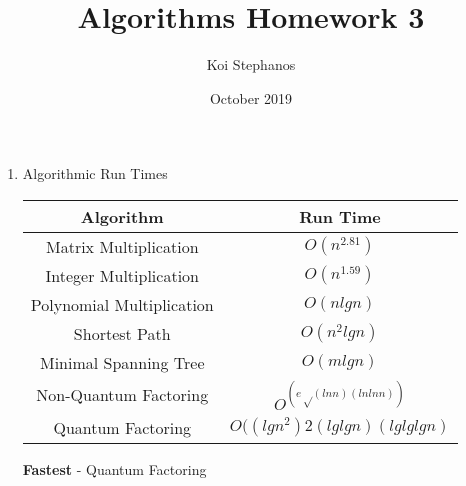 \documentclass{article}
\title{Algorithms Homework 3}
\author{Koi Stephanos}
\date{October 2019}
\begin{document}
\maketitle

\begin{enumerate}
    \item 
Algorithmic Run Times

    \begin{table}[htbp]
        \centering
        \begin{tabular}{|c|c|}
        \hline
             Algorithm & Run Time  \\
        \hline
                Matrix Multiplication \cite{Vazirani}     &      \(O(n^2.81)\)      \\
        \hline
                Integer Multiplication \cite{Vazirani}    &    \(O(n^1.59)\)        \\
        \hline
                Polynomial Multiplication \cite{Vazirani}     &     \(O(n lg n)\)    \\
        \hline
                Shortest Path \cite{CMU}    &      \(O(n^2 lg n)\)    \\
        \hline
                Minimal Spanning Tree \cite{Jordan}    &    \(O(m lg n)\)            \\
        \hline
                Non-Quantum Factoring \cite{Purdue}    &    \(O^(e√(ln n)(ln ln n))\)          \\
        \hline
                Quantum Factoring \cite{Lomonaco}     &     \(O((lg n^2)2(lg lg n)(lg lg lg n)\)    \\
        \hline        
        \end{tabular}
        \label{tab:run_times}
    \end{table}

\textbf{Fastest} - Quantum Factoring


\end{enumerate}
\end{document}
